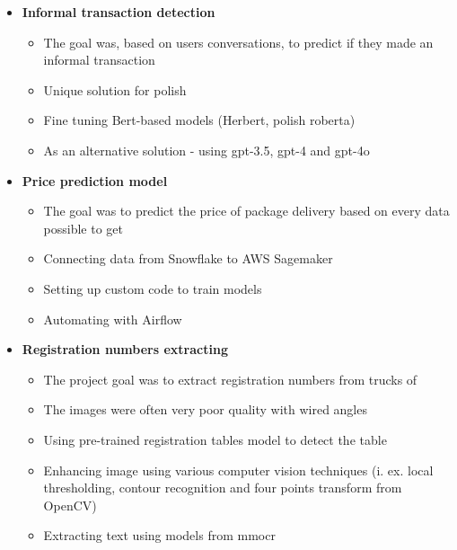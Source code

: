 \documentclass[10pt,a4paper,ragged2e,withhyper, normalphoto]{altacv}
\begin{document}
\begin{paracol}{2}


    \begin{itemize}


        
    \item  \textbf{\textcolor{DarkPastelRed}{Informal transaction detection}}
        \begin{itemize}
            \item The goal was, based on users conversations, to predict if they made an informal transaction 
            \item Unique solution for polish
            \item Fine tuning Bert-based models (Herbert, polish roberta) 
            \item As an alternative solution - using gpt-3.5, gpt-4 and gpt-4o
        \end{itemize}
    
    \item  \textbf{\textcolor{DarkPastelRed}{Price prediction model}}
        \begin{itemize}
            \item The goal was to predict the price of package delivery based on every data possible to get
            \item Connecting data from Snowflake to AWS Sagemaker
            \item Setting up custom code to train models
            \item Automating with Airflow
        \end{itemize}

    \item  \textbf{\textcolor{DarkPastelRed}{Registration numbers extracting}}
        \begin{itemize}
            \item The project goal was to extract registration numbers from trucks of
            \item The images were often very poor quality with wired angles
            \item Using pre-trained registration tables model to detect the table
            \item Enhancing image using various computer vision techniques (i. ex. local thresholding, contour recognition and four points transform from OpenCV)
            \item Extracting text using models from mmocr
        \end{itemize}
    

\end{itemize}
\end{paracol}
\end{document}
